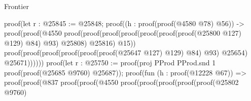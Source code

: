 \begin{lexlean}{Frontier}
\begin{coremodule}
                                                                  proof(let r : @25845 := @25848;
                                                                    proof((h : proof(proof(@4580
                                                                            @78)
                                                                          @56)) ->
                                                                      proof(proof(@4550
                                                                            proof(proof(proof(proof(proof(proof(proof(@25800
                                                                                            @127)
                                                                                          @129)
                                                                                        @84)
                                                                                      @93)
                                                                                    @25808)
                                                                                  @25816)
                                                                                @15))
                                                                          proof(proof(proof(proof(proof(proof(@25647
                                                                                        @127)
                                                                                      @129)
                                                                                    @84)
                                                                                  @93)
                                                                                @25654)
                                                                              @25671))))))
                                                              proof(let r : @25750 := proof(proj PProd PProd.snd 1
                                                                  proof(proof(@25685 @9760)
                                                                      @25687));
                                                                proof(fun (h : proof(@12228 @67)) =>
                                                                  proof(proof(@837
                                                                        proof(proof(@4550
                                                                              proof(proof(proof(proof(proof(@25802
                                                                                          @9760)

\end{coremodule}
\end{lexlean}
